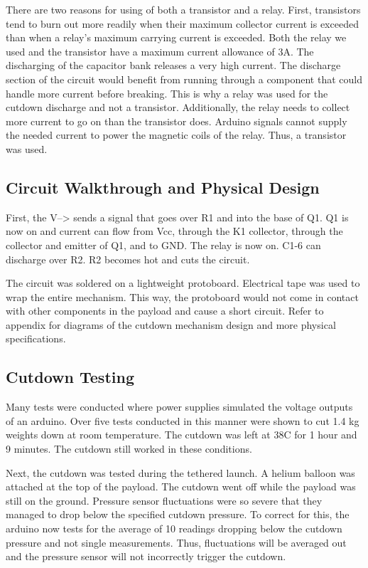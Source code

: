\documentclass[12pt,]{article}
\begin{document}
There are two reasons for using of both a transistor and a relay. First,
transistors tend to burn out more readily when their maximum collector
current is exceeded than when a relay's maximum carrying current is
exceeded. Both the relay we used and the transistor have a maximum
current allowance of 3A. The discharging of the capacitor bank releases
a very high current. The discharge section of the circuit would benefit
from running through a component that could handle more current before
breaking. This is why a relay was used for the cutdown discharge and not
a transistor. Additionally, the relay needs to collect more current to
go on than the transistor does. Arduino signals cannot supply the needed
current to power the magnetic coils of the relay. Thus, a transistor was
used.

\subsection{Circuit Walkthrough and Physical
Design}\label{circuit-walkthrough-and-physical-design}

First, the V--\textgreater{} sends a signal that goes over R1 and into
the base of Q1. Q1 is now on and current can flow from Vcc, through the
K1 collector, through the collector and emitter of Q1, and to GND. The
relay is now on. C1-6 can discharge over R2. R2 becomes hot and cuts the
circuit.

The circuit was soldered on a lightweight protoboard. Electrical tape
was used to wrap the entire mechanism. This way, the protoboard would
not come in contact with other components in the payload and cause a
short circuit. Refer to appendix for diagrams of the cutdown mechanism
design and more physical specifications.

\subsection{Cutdown Testing}\label{cutdown-testing}

Many tests were conducted where power supplies simulated the voltage
outputs of an arduino. Over five tests conducted in this manner were
shown to cut 1.4 kg weights down at room temperature. The cutdown was
left at 38\degree C for 1 hour and 9 minutes. The cutdown still worked
in these conditions.

Next, the cutdown was tested during the tethered launch. A helium
balloon was attached at the top of the payload. The cutdown went off
while the payload was still on the ground. Pressure sensor fluctuations
were so severe that they managed to drop below the specified cutdown
pressure. To correct for this, the arduino now tests for the average of
10 readings dropping below the cutdown pressure and not single
measurements. Thus, fluctuations will be averaged out and the pressure
sensor will not incorrectly trigger the cutdown.
\end{document}
